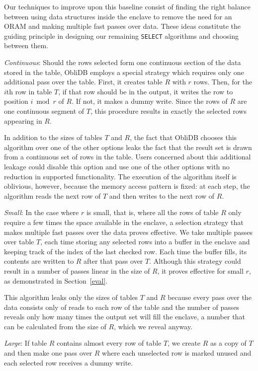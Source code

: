 \documentclass[letterpaper,twocolumn,10pt]{article}
\def\name/{ObliDB}
\begin{document}
Our techniques to improve upon this baseline consist of finding the right balance between using data structures inside the enclave to remove the need for an ORAM and making multiple fast passes over data. These ideas constitute the guiding principle in designing our remaining \texttt{SELECT} algorithms and choosing between them.

\textit{Continuous}: Should the rows selected form one continuous section of the data stored in the table, \name/ employs a special strategy which requires only one additional pass over the table. First, it creates table $R$ with $r$ rows. Then, for the $i$th row in table $T$, if that row should be in the output, it writes the row to position $i\bmod r$ of $R$. If not, it makes a dummy write. Since the rows of $R$ are one continuous segment of $T$, this procedure results in exactly the selected rows appearing in $R$.

In addition to the sizes of tables $T$ and $R$, the fact that \name/ chooses this algorithm over one of the other options leaks the fact that the result set is drawn from a continuous set of rows in the table. Users concerned about this additional leakage could disable this option and use one of the other options with no reduction in supported functionality. The execution of the algorithm itself is oblivious, however, because the memory access pattern is fixed: at each step, the algorithm reads the next row of $T$ and then writes to the next row of $R$.

\textit{Small}: In the case where $r$ is small, that is, where all the rows of table $R$ only require a few times the space available in the enclave, a selection strategy that makes multiple fast passes over the data proves effective. We take multiple passes over table $T$, each time storing any selected rows into a buffer in the enclave and keeping track of the index of the last checked row. Each time the buffer fills, its contents  are written to $R$ after that pass over $T$. Although this strategy could result in a number of passes linear in the size of $R$, it proves effective for small $r$, as demonstrated in Section~\ref{eval}.

This algorithm leaks only the sizes of tables $T$ and $R$ because every pass over the data consists only of reads to each row of the table and the number of passes reveals only how many times the output set will fill the enclave, a number that can be calculated from the size of $R$, which we reveal anyway.

\textit{Large}: If table $R$ contains almost every row of table $T$, we create $R$ as a copy of $T$ and then make one pass over $R$ where each unselected row is marked unused and each selected row receives a dummy write.
\end{document}
